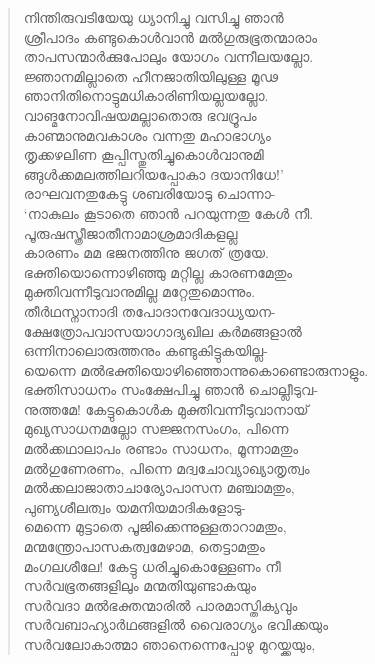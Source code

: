 \begin{verse}
നിന്തിരുവടിയേയു ധ്യാനിച്ചു വസിച്ചു ഞാന്‍\\
ശ്രീപാദം കണ്ടുകൊള്‍വാന്‍ മല്‍ഗുരുഭൂതന്മാരാം\\
താപസന്മാര്‍ക്കുപോലും യോഗം വന്നീലയല്ലോ.\\
ജ്ഞാനമില്ലാതെ ഹീനജാതിയിലുള്ള മൂഢ\\
ഞാനിതിനൊട്ടുമധികാരിണിയല്ലയല്ലോ.\\
വാങ്മനോവിഷയമല്ലാതൊരു ഭവദ്രൂപം\\
കാണ്മാനുമവകാശം വന്നതു മഹാഭാഗ്യം\\
തൃക്കഴലിണ കൂപ്പിസ്തുതിച്ചുകൊള്‍വാനുമി\\
ങ്ങുള്‍ക്കമലത്തിലറിയപ്പോകാ ദയാനിധേ!’\\
രാഘവനതുകേട്ടു ശബരിയോടു ചൊന്നാ-\\
‘നാകുലം കൂടാതെ ഞാന്‍ പറയുന്നതു കേള്‍ നീ.\\
പൂരുഷസ്ത്രീജാതീനാമാശ്രമാദികളല്ല\\
കാരണം മമ ഭജനത്തിനു ജഗത് ത്രയേ.\\
ഭക്തിയൊന്നൊഴിഞ്ഞു മറ്റില്ല കാരണമേതും\\
മുക്തിവന്നീടുവാനുമില്ല മറ്റേതുമൊന്നും.\\
തീര്‍ഥസ്നാനാദി തപോദാനവേദാധ്യയന-\\
ക്ഷേത്രോപവാസയാഗാദ്യഖില കര്‍മങ്ങളാല്‍\\
ഒന്നിനാലൊരുത്തനും കണ്ടുകിട്ടുകയില്ല-\\
യെന്നെ മല്‍ഭക്തിയൊഴിഞ്ഞൊന്നുകൊണ്ടൊരുനാളും.\\
ഭക്തിസാധനം സംക്ഷേപിച്ചു ഞാന്‍ ചൊല്ലീടുവ-\\
നുത്തമേ! കേട്ടുകൊള്‍ക മുക്തിവന്നീടുവാനായ്\\
മുഖ്യസാധനമല്ലോ സജ്ജനസംഗം, പിന്നെ\\
മല്‍ക്കഥാലാപം രണ്ടാം സാധനം, മൂന്നാമതും\\
മല്‍ഗുണേരണം, പിന്നെ മദ്വചോവ്യാഖ്യാതൃത്വം\\
മല്‍ക്കലാജാതാചാര്യോപാസന മഞ്ചാമതും,\\
പുണ്യശീലത്വം യമനിയമാദികളോടു-\\
മെന്നെ മുട്ടാതെ പൂജിക്കെന്നുള്ളതാറാമതും,\\
മന്മന്ത്രോപാസകത്വമേഴാമ, തെട്ടാമതും\\
മംഗലശീലേ! കേട്ടു ധരിച്ചുകൊള്ളേണം നീ\\
സര്‍വഭൂതങ്ങളിലും മന്മതിയുണ്ടാകയും\\
സര്‍വദാ മല്‍ഭക്തന്മാരില്‍ പാരമാസ്തിക്യവും\\
സര്‍വബാഹ്യാര്‍ഥങ്ങളില്‍ വൈരാഗ്യം ഭവിക്കയും\\
സര്‍വലോകാത്മാ ഞാനെന്നെപ്പോഴു മുറയ്ക്കയും,\\

\end{verse}
